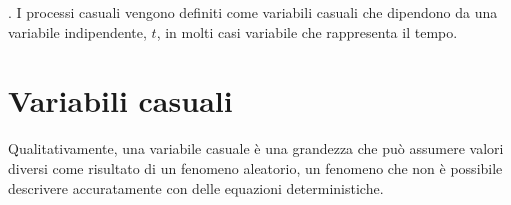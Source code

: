 \documentclass[letterpaper,10pt,italian]{jupyterBook}
\begin{document}
\sphinxAtStartPar
{\hyperref[\detokenize{ch/statistics/random_variables:statistics-hs-random-variables}]{}}. I processi casuali vengono definiti come variabili casuali che dipendono da una variabile indipendente, \(t\), in molti casi variabile che rappresenta il tempo.

\sphinxstepscope


\section{Variabili casuali}
\label{\detokenize{ch/statistics/random_variables:variabili-casuali}}\label{\detokenize{ch/statistics/random_variables:statistics-hs-random-variables}}\label{\detokenize{ch/statistics/random_variables::doc}}
\sphinxAtStartPar
Qualitativamente, una variabile casuale è una grandezza che può assumere valori diversi come risultato di un fenomeno aleatorio, un fenomeno che non è possibile descrivere accuratamente con delle equazioni deterministiche.  

\sphinxAtStartPar
{}
{\hyperref[\detokenize{ch/statistics::doc}]{}}

\sphinxAtStartPar
{\hyperref[\detokenize{ch/statistics::doc}]{}}

\sphinxAtStartPar
{\hyperref[\detokenize{ch/statistics::doc}]{}}

\sphinxAtStartPar
{\hyperref[\detokenize{ch/statistics::doc}]{}}

\sphinxAtStartPar
{\hyperref[\detokenize{ch/statistics::doc}]{}}

\sphinxAtStartPar
{\hyperref[\detokenize{ch/statistics::doc}]{}}

\sphinxAtStartPar
{\hyperref[\detokenize{ch/statistics::doc}]{}}
\end{document}
